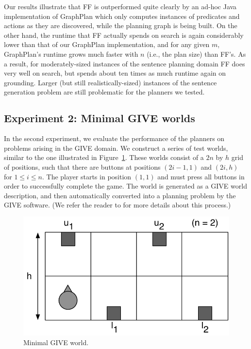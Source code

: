 Our results illustrate that FF is outperformed quite clearly by an ad-hoc
Java implementation of GraphPlan which only computes instances of
predicates and actions as they are discovered, while the planning graph is
being built. On the other hand, the runtime that FF actually spends on
search is again considerably lower than that of our GraphPlan
implementation, and for any given $m$, GraphPlan's runtime grows much
faster with $n$ (i.e., the plan size) than FF's. As a result, for
moderately-sized instances of the sentence planning domain FF does very
well on search, but spends about ten times as much runtime again on
grounding. Larger (but still realistically-sized) instances of the sentence
generation problem are still problematic for the planners we tested.



\subsection{Experiment 2: Minimal GIVE worlds}
\label{sec:exper-2:-minim}

In the second experiment, we evaluate the performance of the planners on
problems arising in the GIVE domain. We construct a series of test worlds,
similar to the one illustrated in Figure~\ref{fig:give-minimal}. These
worlds consist of a $2n$ by $h$ grid of positions, such that there are
buttons at positions $(2i-1,1)$ and $(2i,h)$ for $1 \leq i \leq n$. The
player starts in position $(1,1)$ and must press all buttons in order to
successfully complete the game. The world is generated as a GIVE world
description, and then automatically converted into a planning problem by
the GIVE software. (We refer the reader to  for more
details about this process.)

\begin{figure}
  \centering
  \includegraphics[width=0.8\columnwidth]{pic-buttons}
  \caption{Minimal GIVE world.}
  \label{fig:give-minimal}
\end{figure}

